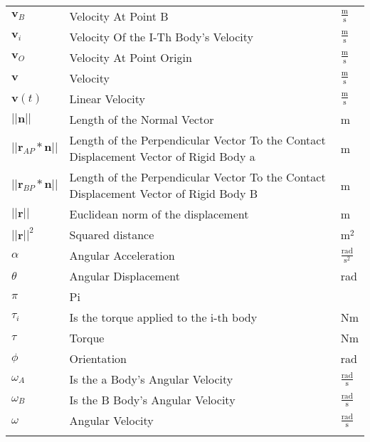 \documentclass[12pt]{article}
\begin{document}
\begin{longtabu}{l X[l] l}
${\mathbf{v}_{B}}$ & Velocity At Point B & $\frac{\text{m}}{\text{s}}$
\\
${\mathbf{v}_{i}}$ & Velocity Of the I-Th Body's Velocity & $\frac{\text{m}}{\text{s}}$
\\
${\mathbf{v}_{O}}$ & Velocity At Point Origin & $\frac{\text{m}}{\text{s}}$
\\
$\mathbf{v}$ & Velocity & $\frac{\text{m}}{\text{s}}$
\\
$\mathbf{v}(t)$ & Linear Velocity & $\frac{\text{m}}{\text{s}}$
\\
$||\mathbf{n}||$ & Length of the Normal Vector & m
\\
$||{\mathbf{r}_{AP}}*\mathbf{n}||$ & Length of the Perpendicular Vector To the Contact Displacement Vector of Rigid Body a & m
\\
$||{\mathbf{r}_{BP}}*\mathbf{n}||$ & Length of the Perpendicular Vector To the Contact Displacement Vector of Rigid Body B & m
\\
$||\mathbf{r}||$ & Euclidean norm of the displacement & m
\\
${||\mathbf{r}||^{2}}$ & Squared distance & $\text{m}^{2}$
\\
$\alpha{}$ & Angular Acceleration & $\frac{\text{rad}}{\text{s}^{2}}$
\\
$\theta{}$ & Angular Displacement & rad
\\
$\pi{}$ & Pi & 
\\
${\tau{}_{i}}$ & Is the torque applied to the i-th body & Nm
\\
$\tau{}$ & Torque & Nm
\\
$\phi{}$ & Orientation & rad
\\
${\omega{}_{A}}$ & Is the a Body's Angular Velocity & $\frac{\text{rad}}{\text{s}}$
\\
${\omega{}_{B}}$ & Is the B Body's Angular Velocity & $\frac{\text{rad}}{\text{s}}$
\\
$\omega{}$ & Angular Velocity & $\frac{\text{rad}}{\text{s}}$
\\
\bottomrule
\label{Table:ToS}
\end{longtabu}
\end{document}
